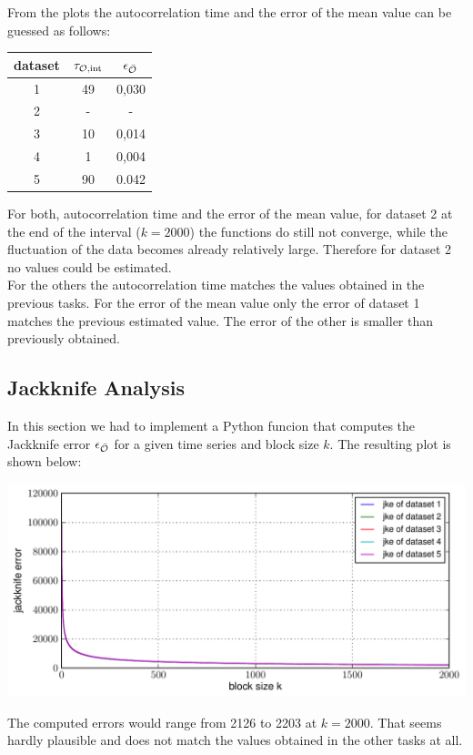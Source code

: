 \documentclass[12pt,a4paper]{scrartcl}
\begin{document}
From the plots the autocorrelation time and the error of the mean value can be guessed as follows:

\begin{center}

\begin{tabular}{|c|c|c|}
\hline 
dataset & $\tau_{\cal{O},\text{int}}$ & $\epsilon_{\bar{\cal O} {}}$ \\ 
\hline 
1 & 49 & 0,030 \\ 
\hline 
2 & - & - \\ 
\hline 
3 & 10 & 0,014 \\ 
\hline 
4 & 1 & 0,004 \\ 
\hline 
5 & 90 & 0.042 \\ 
\hline 
\end{tabular} 

\end{center}

For both, autocorrelation time and the error of the mean value, for dataset 2 at the end of the interval ($k=2000$) the functions do still not converge, while the fluctuation of the data becomes already relatively large. Therefore for dataset 2 no values could be estimated.\\
For the others the autocorrelation time matches the values obtained in the previous tasks. For the error of the mean value only the error of dataset 1 matches the previous estimated value. The error of the other is smaller than previously obtained.

\subsection{Jackknife Analysis}
In this section we had to implement a Python funcion that computes the Jackknife error $\epsilon_{\bar{\cal O} {}}$ for a given time series and block size $k$. The resulting plot is shown below:

\begin{minipage}[hbt]{15cm}
	\centering
	\includegraphics[width=16cm]{../plots/jackk.pdf}
\end{minipage}

The computed errors would range from 2126 to 2203 at $k=2000$. That seems hardly plausible and does not match the values obtained in the other tasks at all.
\end{document}
